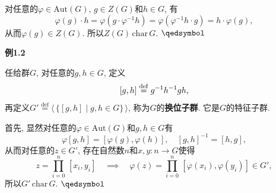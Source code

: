 \documentclass[UTF8]{ctexart}
\begin{document}

对任意的$\varphi\in\mathrm{Aut}(G)$, $g\in Z(G)$和$h\in G$, 有
\[
    \varphi(g)\cdot h=\varphi(g\cdot\varphi^{-1}h)=
    \varphi(\varphi^{-1}h\cdot g)=h\cdot\varphi(g),
\]
从而$\varphi(g)\in Z(G)$. 所以$Z(G)\,\mathrm{char}\,G$. \hfill $\qedsymbol$

\vspace{10pt}

\hypertarget{sec:例1.2}{}
\noindent\textbf{例1.2}

任给群$G$, 对任意的$g,h\in G$, 定义
\vspace{-3pt}
\[
    [g,h]\overset{\mathrm{def}}{=}g^{-1}h^{-1}gh,\\[-3pt]
\]
再定义$G'\overset{\mathrm{def}}{=}\langle\,\{[g,h]\mid g,h\in G\}\,\rangle$,
称为$G$的\textbf{换位子群}. 它是$G$的特征子群.


首先, 显然对任意的$\varphi\in\mathrm{Aut}(G)$和$g,h\in G$有
\[
    \varphi[g,h]=[\varphi(g),\varphi(h)],\quad[g,h]^{-1}=[h,g],
\]
从而对任意的$z\in G'$, 存在自然数$n$和$x,y:n\to G$使得
\vspace{3pt}
\[
    z=\prod_{i=0}^n\,[x_i,y_i]\quad\implies\quad
    \varphi(z)=\prod_{i=0}^n\,[\varphi(x_i),\varphi(y_i)]\in G',
\]
所以$G'\,\mathrm{char}\,G$. \hfill $\qedsymbol$
\end{document}
